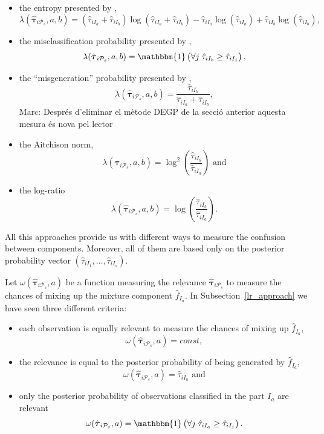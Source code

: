 \documentclass[10pt, a4paper]{article}
\newcommand{\m}[1]{\boldsymbol{#1}}
\begin{document}
\begin{spacing}{1.9}
\begin{itemize}
\item the entropy presented by \cite{baudry2010combining},
\[\lambda(\hat{\m \tau}_{i \mathcal{P}_s}, a, b) = (\hat{\tau}_{iI_a}+\hat{\tau}_{iI_b}) \log(\hat{\tau}_{iI_a} + \hat{\tau}_{iI_b}) - \hat{\tau}_{iI_a} \log(\hat{\tau}_{iI_a}) + \hat{\tau}_{iI_b} \log(\hat{\tau}_{iI_b}),\]
\item the misclassification probability presented by \cite{hennig2010methods}, \[\lambda(\hat{\m \tau}_{i \mathcal{P}_s}, a, b) = \mathbbm{1}\left( \forall j\; \hat{\tau}_{i I_{b}} \geq \hat{\tau}_{iI_j} \right),\]
\item the ``misgeneration'' probability presented by \cite{longford2014}, \[\lambda(\hat{\m \tau}_{i \mathcal{P}_s}, a, b) = \frac{\hat{\tau}_{iI_b}}{\hat{\tau}_{iI_a} + \hat{\tau}_{iI_b}},\]{\color{blue} Marc: Després d'eliminar el mètode DEGP de la secció anterior aquesta mesura és nova pel lector}
\item the Aitchison norm, \[\lambda(\hat{\m \tau}_{i \mathcal{P}_s}, a, b) = \log^2 (\frac{ \hat{\tau}_{iI_b} }{ \hat{\tau}_{iI_a} }) \text{ and}\]
\item the log-ratio \[ \lambda(\hat{\m \tau}_{i \mathcal{P}_s}, a, b) = \log (\frac{ \hat{\tau}_{iI_b} }{ \hat{\tau}_{iI_a} }).\]
\end{itemize}

All this approaches provide us with different ways to measure the confusion between components. Moreover, all of them are based only on the posterior probability
vector $(\hat{\tau}_{i I_{1}}, \dots, \hat{\tau}_{i I_{s}})$.

Let $\omega(\hat{\m \tau}_{i \mathcal{P}_s}, a)$ be a function measuring the relevance $\hat{\m \tau}_{i \mathcal{P}_s}$ to measure the chances of mixing up  the mixture component $\hat{f}_{I_a}$. In Subsection~\ref{lr_approach} we have seen three different criteria:

\begin{itemize}
\item each observation is equally relevant to measure the chances of mixing up  $\hat{f}_{I_a}$,
\[\omega(\hat{\m \tau}_{i \mathcal{P}_s}, a) = const,\]
\item the relevance is equal to the posterior probability of being generated by  $\hat{f}_{I_a}$,
\[\omega(\hat{\m \tau}_{i \mathcal{P}_s}, a) =  \hat{\tau}_{iI_a} \text{ and}\]
\item  only the posterior probability of observations classified in the part   $I_a$ are relevant
\[\omega(\hat{\m \tau}_{i \mathcal{P}_s}, a) = \mathbbm{1}\left( \forall j\; \hat{\tau}_{i I_{a}} \geq \hat{\tau}_{iI_j} \right).\]
\end{itemize}




\end{spacing}
\end{document}
